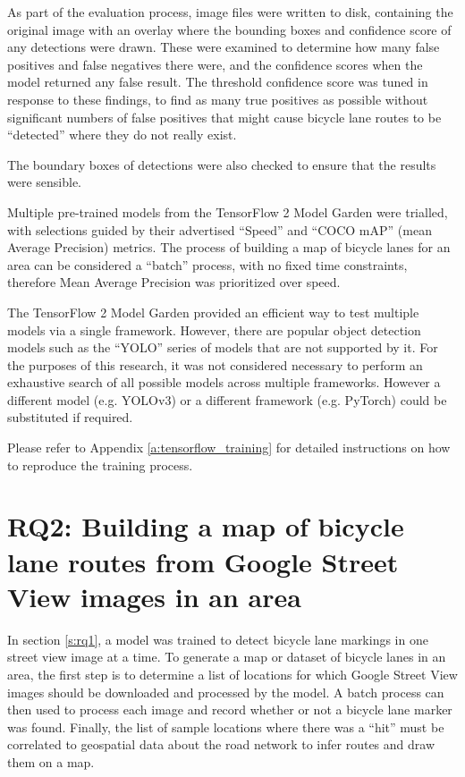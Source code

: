 \documentclass[11pt,twoside]{report}
\begin{document}
As part of the evaluation process, image files were written to disk, containing the original image with an overlay where the bounding boxes and confidence score of any detections were drawn.  These were examined to determine how many false positives and false negatives there were, and the confidence scores when the model returned any false result.  The threshold confidence score was tuned in response to these findings, to find as many true positives as possible without significant numbers of false positives that might cause bicycle lane routes to be ``detected'' where they do not really exist.

The boundary boxes of detections were also checked to ensure that the results were sensible.

Multiple pre-trained models from the TensorFlow 2 Model Garden were trialled, with selections guided by their advertised ``Speed'' and ``COCO mAP'' (mean Average Precision) metrics.  The process of building a map of bicycle lanes for an area can be considered a ``batch'' process, with no fixed time constraints, therefore Mean Average Precision was prioritized over speed.

The TensorFlow 2 Model Garden provided an efficient way to test multiple models via a single framework.  However, there are popular object detection models such as the ``YOLO'' series of models that are not supported by it.  For the purposes of this research, it was not considered necessary to perform an exhaustive search of all possible models across multiple frameworks.  However a different model (e.g. YOLOv3) or a different framework (e.g. PyTorch) could be substituted if required.

Please refer to Appendix \ref{a:tensorflow_training} for detailed instructions on how to reproduce the training process.

\section{RQ2: Building a map of bicycle lane routes from Google Street View images in an area}
\label{s:rq2}

In section \ref{s:rq1}, a model was trained to detect bicycle lane markings in one street view image at a time.  To generate a map or dataset of bicycle lanes in an area, the first step is to determine a list of locations for which Google Street View images should be downloaded and processed by the model.  A batch process can then used to process each image and record whether or not a bicycle lane marker was found.  Finally, the list of sample locations where there was a ``hit'' must be correlated to geospatial data about the road network to infer  routes and draw them on a map.
\end{document}
